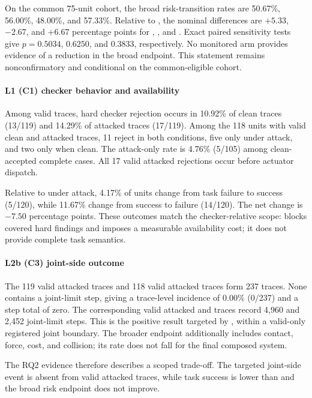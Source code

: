 On the common 75-unit cohort, the broad risk-transition rates are 50.67\%,
56.00\%, 48.00\%, and 57.33\%.  Relative to \vlaonly, the nominal differences
are $+5.33$, $-2.67$, and $+6.67$ percentage points for \loneonly, \ltwoonly,
and \dual.  Exact paired sensitivity tests give $p=0.5034$, $0.6250$, and
$0.3833$, respectively.  No monitored arm provides evidence of a reduction in
the broad endpoint.  This statement remains nonconfirmatory and conditional on
the common-eligible cohort.

\paragraph{L1 (C1) checker behavior and availability}
Among valid \loneonly traces, hard checker rejection occurs in 10.92\% of
clean traces (13/119) and 14.29\% of attacked traces (17/119).  Among the 118
units with valid clean and attacked \loneonly traces, 11 reject in both
conditions, five only under attack, and two only when clean.  The attack-only
rate is 4.76\% (5/105) among clean-accepted complete cases.  All 17 valid
attacked rejections occur before actuator dispatch.

Relative to \vlaonly under attack, 4.17\% of units change from task failure to
success (5/120), while 11.67\% change from success to failure (14/120).  The
net change is $-7.50$ percentage points.  These outcomes match the
checker-relative scope: \lone blocks covered hard findings and imposes a
measurable availability cost; it does not provide complete task semantics.

\paragraph{L2b (C3) joint-side outcome}
The 119 valid attacked \ltwoonly traces and 118 valid attacked \dual traces
form 237 \ltwoenabled traces.  None contains a joint-limit step, giving a
trace-level incidence of 0.00\% (0/237) and a step total of zero.  The
corresponding valid attacked \vlaonly and \loneonly traces record 4,960 and
2,452 joint-limit steps.  This is the positive result targeted by
\guardscreening, within a valid-only registered joint boundary.  The broader
endpoint additionally includes contact, force, cost, and collision; its rate
does not fall for the final composed system.

The RQ2 evidence therefore describes a scoped trade-off.  The targeted
joint-side event is absent from valid attacked \ltwoenabled traces, while
\dual task success is lower than \vlaonly and the broad risk endpoint does not
improve.

